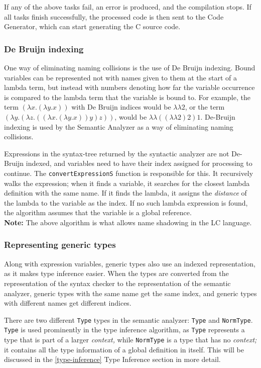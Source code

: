 \documentclass[12pt]{article}
\begin{document}
If any of the above tasks fail, an error is produced, and the compilation stops.
If all tasks finish successfully, the processed code is then sent to the Code
Generator, which can start generating the C source code.

\subsubsection{De Bruijn indexing}

One way of eliminating naming collisions is the use of De Bruijn indexing. Bound
variables can be represented not with names given to them at the start of a
lambda term, but instead with numbers denoting how far the variable occurrence
is compared to the lambda term that the variable is bound to. For example, the
term $(\lambda x. (\lambda y. x))$ with De Bruijn indices would be $\lambda
\lambda 2$, or the term $(\lambda y. (\lambda z. ((\lambda x. (\lambda y. x)) y)
z))$, would be $\lambda \lambda ((\lambda \lambda 2) 2) 1$. De-Bruijn indexing
is used by the Semantic Analyzer as a way of eliminating naming collisions.
\cite{de-bruijn-indexing}

Expressions in the syntax-tree returned by the syntactic analyzer are not
De-Bruijn indexed, and variables need to have their index assigned for
processing to continue. The \verb$convertExpressionS$ function is responsible
for this. It recursively walks the expression; when it finds a variable, it
searches for the closest lambda definition with the same name. If it finds the
lambda, it assigns the \emph{distance} of the lambda to the variable as the
index. If no such lambda expression is found, the algorithm assumes that the
variable is a global reference. \\
\textbf{Note:} The above algorithm is what allows name shadowing in the LC
language.

\subsubsection{Representing generic types}

Along with expression variables, generic types also use an indexed
representation, as it makes type inference easier. When the types are converted
from the representation of the syntax checker to the representation of the
semantic analyzer, generic types with the same name get the same index, and
generic types with different names get different indices.

There are two different \verb$Type$ types in the semantic analyzer: \verb$Type$
and \verb$NormType$. \verb$Type$ is used prominently in the type inference
algorithm, as \verb$Type$ represents a type that is part of a larger
\emph{context,} while \verb$NormType$ is a type that has no \emph{context;} it
contains all the type information of a global definition in itself. This will be
discussed in the \ref{type-inference} Type Inference section in more detail.
\end{document}
